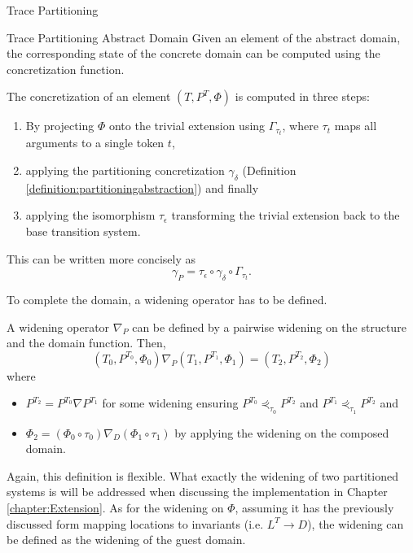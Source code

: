\begin{chapter}{Trace Partitioning}
\begin{section}{Trace Partitioning Abstract Domain}
		Given an element of the abstract domain, the corresponding state of the concrete domain can be computed using the concretization function. 

		\begin{definition}
			The concretization of an element $(T, P^T, \Phi)$ is computed in three steps:
			\begin{enumerate}
				\item By projecting $\Phi$ onto the trivial extension using $\Gamma_{\tau_t}$, where $\tau_t$ maps all arguments to a single token $t$,
				\item applying the partitioning concretization $\gamma_\delta$ (Definition \ref{definition:partitioningabstraction}) and finally
				\item applying the isomorphism $\tau_\epsilon$ transforming the trivial extension back to the base transition system.
			\end{enumerate}
			This can be written more concisely as
			\begin{equation}
				\gamma_P = \tau_\epsilon \circ \gamma_\delta \circ \Gamma_{\tau_t}.
			\end{equation}
		\end{definition}

		To complete the domain, a widening operator has to be defined.

		\begin{definition}
			A widening operator $\nabla_P$ can be defined by a pairwise widening on the structure and the domain function. Then, 
			\begin{equation}
				(T_0, P^{T_0}, \Phi_0) \nabla_P (T_1, P^{T_1}, \Phi_1) = (T_2, P^{T_2}, \Phi_2)
			\end{equation}
			where
			\begin{itemize}
				\item $P^{T_2} = P^{T_0} \nabla P^{T_1}$ for some widening ensuring $P^{T_0} \curlyeqprec_{\tau_0} P^{T_2}$ and $P^{T_1} \curlyeqprec_{\tau_1} P^{T_2}$ and
				\item $\Phi_2 = (\Phi_0 \circ \tau_0) \nabla_D (\Phi_1 \circ \tau_1)$ by applying the widening on the composed domain.
			\end{itemize}
		\end{definition}

		Again, this definition is flexible. What exactly the widening of two partitioned systems is will be addressed when discussing the implementation in Chapter \ref{chapter:Extension}. As for the widening on $\Phi$, assuming it has the previously discussed form mapping locations to invariants (i.e. $L^T \to D$), the widening can be defined as the widening of the guest domain.
	\end{section}


\end{chapter}
